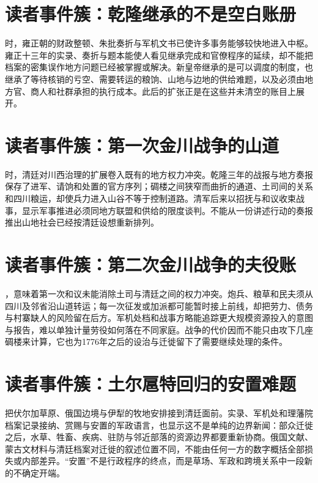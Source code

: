 \section{读者事件簇：乾隆继承的不是空白账册}

时，雍正朝的财政整顿、朱批奏折与军机文书已使许多事务能够较快地进入中枢。雍正十三年的实录、奏折与题本能使人看见继承完成和官僚程序的延续，却不能把档案的密集误作地方问题已经被掌握或解决。新皇帝继承的是可以调度的制度，也继承了等待核销的亏空、需要转运的粮饷、山地与边地的供给难题，以及必须由地方官、商人和社群承担的执行成本。此后的扩张正是在这些并未清空的账目上展开。

\section{读者事件簇：第一次金川战争的山道}

时，清廷对川西治理的扩展卷入既有的地方权力冲突。乾隆三年的战报与地方奏报保存了进军、请饷和处置的官方序列；碉楼之间狭窄而曲折的通道、土司间的关系和四川粮运，却使兵力进入山谷不等于控制道路。清军后来以招抚与和议收束战事，显示军事推进必须同地方联盟和供给的限度谈判。不能从一份讲述行动的奏报推出山地社会已经按清廷设想重新排列。

\section{读者事件簇：第二次金川战争的夫役账}

，意味着第一次和议未能消除土司与清廷之间的权力冲突。炮兵、粮草和民夫须从四川及邻省沿山道转运；每一次征发或加派都可能暂时接上前线，却把劳力、债务与村寨缺人的风险留在后方。军机处档和战事方略能追踪更大规模资源投入的意图与报告，难以单独计量劳役如何落在不同家庭。战争的代价因而不能只由攻下几座碉楼来计算，它也为1776年之后的设治与迁徙留下了需要继续处理的条件。

\section{读者事件簇：土尔扈特回归的安置难题}

把伏尔加草原、俄国边境与伊犁的牧地安排接到清廷面前。实录、军机处和理藩院档案记录接纳、赏赐与安置的军政语言，也显示这不是单纯的边界新闻：部众迁徙之后，水草、牲畜、疾病、驻防与邻近部落的资源边界都要重新协商。俄国文献、蒙古文材料与清廷档案对迁徙的叙述位置不同，不能由任何一方的数字概括全部损失或内部差异。“安置”不是行政程序的终点，而是草场、军政和跨境关系中一段新的不确定开端。
